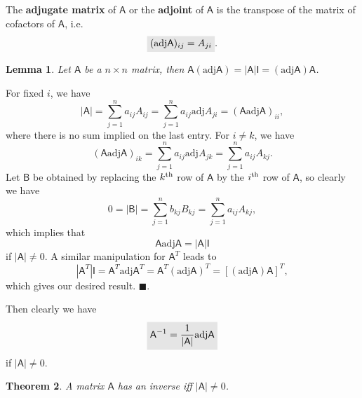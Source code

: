 \documentclass[letter-paper]{tufte-book}
\newtheorem{theorem}{\color{pastel-blue}Theorem}[section]
\newtheorem{lemma}[theorem]{\color{pastel-blue}Lemma}
\newenvironment{proof}[1][Proof]{\begin{trivlist}
\item[\hskip \labelsep {\bfseries #1}]}{\end{trivlist}}
\newcommand{\As}{{\mathsf{A}}}
\newcommand{\Bs}{{\mathsf{B}}}
\newcommand{\Is}{{\mathsf{I}}}
\newcommand{\qed}{\hfill$\blacksquare$}
\newcommand{\highlight}[1]{\mathchoice%
  {\colorbox{black!10}{$\displaystyle#1$}}%
  {\colorbox{black!10}{$\textstyle#1$}}%
  {\colorbox{black!10}{$\scriptstyle#1$}}%
  {\colorbox{black!10}{$\scriptscriptstyle#1$}}}%
\begin{document}
The \textbf{adjugate matrix} of $\As$ or the \textbf{adjoint} of $\As$ is the transpose of the matrix of cofactors of $\As$, i.e.
\begin{equation}
  \highlight{(\mbox{adj} \As)_{ij} = A_{ji}}.
\end{equation}

\begin{lemma}
  Let $\As$ be a $n\times n$ matrix, then $\As (\mbox{adj}\As) = |\As| \Is = (\mbox{adj}\As) \As$.
\end{lemma}

\begin{proof}
  For fixed $i$, we have
  \begin{equation*}
    |\As| = \sum_{j=1}^n a_{ij} A_{ij} = \sum_{j=1}^n a_{ij} \mbox{adj} A_{ji} = (\As \mbox{adj} \As)_{ii},
  \end{equation*}
  where there is no sum implied on the last entry. For $i\neq k$, we have
  \begin{equation*}
    (\As \mbox{adj} \As)_{ik} = \sum_{j=1}^n a_{ij} \mbox{adj} A_{jk} = \sum_{j=1}^n a_{ij} A_{kj}.
  \end{equation*}
  Let $\Bs$ be obtained by replacing the $k^{\tiny\textnormal{th}}$ row of $\As$ by the $i^{\tiny\textnormal{th}}$ row of $\As$, so clearly we have
  \begin{equation*}
    0 = |\Bs| = \sum_{j=1}^n b_{kj} B_{kj} = \sum_{j=1}^n a_{ij} A_{kj},
  \end{equation*}
  which implies that
  \begin{equation*}
    \As \mbox{adj} \As = |\As| \Is
  \end{equation*}
  if $|\As| \neq 0$. A similar manipulation for $\As^T$ leads to
  \begin{equation*}
    |\As^T| \Is = \As^T \mbox{adj}\As^T = \As^T (\mbox{adj}\As)^T = \left[(\mbox{adj}\As) \As\right]^T,
  \end{equation*}
  which gives our desired result. \qed.
\end{proof}

Then clearly we have
\begin{equation}
  \highlight{\As^{-1} = \frac{1}{|\As|} \mbox{adj}\As}
\end{equation}
if $|\As| \neq 0$.

\begin{theorem}
  A matrix $\As$ has an inverse iff $|\As| \neq 0$.
\end{theorem}
\end{document}
